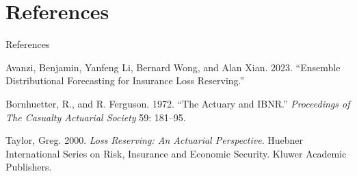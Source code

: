 \documentclass[
  ignorenonframetext,
  t,handout]{beamer}
\newlength{\cslhangindent}
\newenvironment{CSLReferences}[2] %
 {\begin{list}{}{%
  \setlength{\itemindent}{0pt}
  \setlength{\leftmargin}{0pt}
  \setlength{\parsep}{0pt}
  \ifodd #1
   \setlength{\leftmargin}{\cslhangindent}
   \setlength{\itemindent}{-1\cslhangindent}
  \fi
  \setlength{\itemsep}{#2\baselineskip}}}
 {\end{list}}
\begin{document}
\section*{References}\label{references}

\begin{frame}[allowframebreaks]{References}
\label{refs}
\begin{CSLReferences}{1}{0}
Avanzi, Benjamin, Yanfeng Li, Bernard Wong, and Alan Xian. 2023.
{``Ensemble Distributional Forecasting for Insurance Loss Reserving.''}

Bornhuetter, R., and R. Ferguson. 1972. {``The Actuary and
\textsc{IBNR}.''} \emph{Proceedings of The Casualty Actuarial Society}
59: 181--95.

Taylor, Greg. 2000. \emph{Loss Reserving: An Actuarial Perspective}.
Huebner International Series on Risk, Insurance and Economic Security.
Kluwer Academic Publishers.

\end{CSLReferences}
\end{frame}
\end{document}
